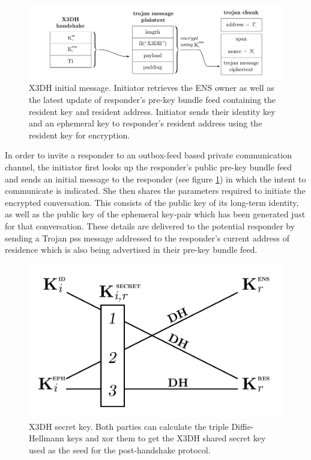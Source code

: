 \begin{figure}[htbp]
   \centering
   \includegraphics[width=.8\textwidth]{fig/x3dh-initial-message.pdf}
   \caption[X3DH initial message \statusgreen]{X3DH initial message. Initiator retrieves the ENS owner as well as the latest update of responder's pre-key bundle feed containing the resident key and resident address. Initiator sends their identity key and an ephemeral key to responder's resident address using the resident key for encryption. }
\label{fig:x3dh-initial-message}
\end{figure}


In order to invite a responder to an outbox-feed based private communication channel, the initiator first looks up the responder's public pre-key bundle feed and sends an initial message to the responder (see figure \ref{fig:x3dh-initial-message}) in which the intent to communicate is indicated. She then shares the parameters required to initiate the encrypted conversation. This consists of the public key of its long-term identity, as well as the public key of the ephemeral key-pair which has been generated just for that conversation. These details are delivered to the potential responder by sending a Trojan pss message addressed to the responder's current address of residence which is also being advertised in their pre-key bundle feed. 

\begin{figure}[htbp]
   \centering
   \includegraphics[width=.6\textwidth]{fig/x3dh.pdf}
   \caption[X3DH secret key \statusgreen]{X3DH secret key. Both parties can calculate the triple Diffie-Hellmann keys and xor them to get the X3DH shared secret key used as the seed for the post-handshake protocol.}
   \label{fig:x3dh}
\end{figure}

